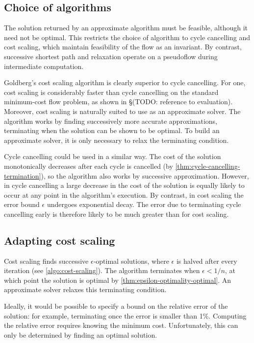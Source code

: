 \subsection{Choice of algorithms} \label{sec:impl-approx-choice}

The solution returned by an approximate algorithm must be feasible, although it need not be optimal. This restricts the choice of algorithm to cycle cancelling and cost scaling, which maintain feasibility of the flow as an invariant. By contrast, successive shortest path and relaxation operate on a pseudoflow during intermediate computation.

Goldberg's cost scaling algorithm is clearly superior to cycle cancelling. For one, cost scaling is considerably faster than cycle cancelling on the standard minimum-cost flow problem, as shown in \S(TODO: reference to evaluation). Moreover, cost scaling is naturally suited to use as an approximate solver. The algorithm works by finding successively more accurate approximations, terminating when the solution can be shown to be optimal. To build an approximate solver, it is only necessary to relax the terminating condition.

Cycle cancelling could be used in a similar way. The cost of the solution monotonically decreases after each cycle is cancelled (by \cref{thm:cycle-cancelling-termination}), so the algorithm also works by successive approximation. However, in cycle cancelling a large decrease in the cost of the solution is equally likely to occur at any point in the algorithm's execution. By contrast, in cost scaling the error bound $\epsilon$ undergoes exponential decay. The error due to terminating cycle cancelling early is therefore likely to be much greater than for cost scaling.

\subsection{Adapting cost scaling}

Cost scaling finds successive $\epsilon$-optimal solutions, where $\epsilon$ is halved after every iteration (see \cref{algo:cost-scaling}). The algorithm terminates when $\epsilon < 1/n$, at which point the solution is optimal by \cref{thm:epsilon-optimality-optimal}. An approximate solver relaxes this terminating condition.

Ideally, it would be possible to specify a bound on the relative error of the solution: for example, terminating once the error is smaller than 1\%. Computing the relative error requires knowing the minimum cost. Unfortunately, this can only be determined by finding an optimal solution.

